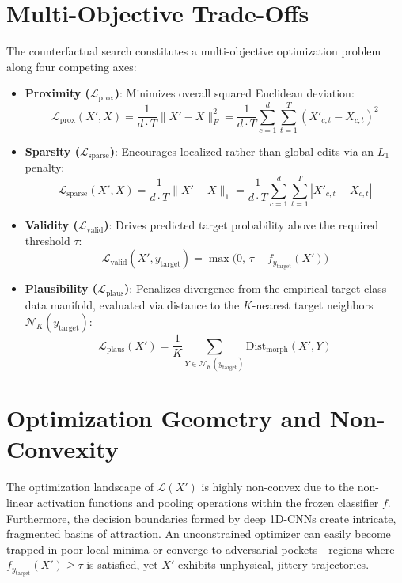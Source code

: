 \documentclass[11pt,a4paper]{report}
\begin{document}
\section{Multi-Objective Trade-Offs}
The counterfactual search constitutes a multi-objective optimization problem along four competing axes:
\begin{itemize}
    \item \textbf{Proximity ($\mathcal{L}_{\text{prox}}$)}: Minimizes overall squared Euclidean deviation:
    \begin{equation}
        \mathcal{L}_{\text{prox}}(X', X) = \frac{1}{d \cdot T} \|X' - X\|_F^2 = \frac{1}{d \cdot T} \sum_{c=1}^d \sum_{t=1}^T (X'_{c,t} - X_{c,t})^2
    \end{equation}
    \item \textbf{Sparsity ($\mathcal{L}_{\text{sparse}}$)}: Encourages localized rather than global edits via an $L_1$ penalty:
    \begin{equation}
        \mathcal{L}_{\text{sparse}}(X', X) = \frac{1}{d \cdot T} \|X' - X\|_1 = \frac{1}{d \cdot T} \sum_{c=1}^d \sum_{t=1}^T |X'_{c,t} - X_{c,t}|
    \end{equation}
    \item \textbf{Validity ($\mathcal{L}_{\text{valid}}$)}: Drives predicted target probability above the required threshold $\tau$:
    \begin{equation}
        \mathcal{L}_{\text{valid}}(X', y_{\text{target}}) = \max\Big(0, \, \tau - f_{y_{\text{target}}}(X')\Big)
    \end{equation}
    \item \textbf{Plausibility ($\mathcal{L}_{\text{plaus}}$)}: Penalizes divergence from the empirical target-class data manifold, evaluated via distance to the $K$-nearest target neighbors $\mathcal{N}_K(y_{\text{target}})$:
    \begin{equation}
        \mathcal{L}_{\text{plaus}}(X') = \frac{1}{K} \sum_{Y \in \mathcal{N}_K(y_{\text{target}})} \text{Dist}_{\text{morph}}(X', Y)
    \end{equation}
\end{itemize}

\section{Optimization Geometry and Non-Convexity}
The optimization landscape of $\mathcal{L}(X')$ is highly non-convex due to the non-linear activation functions and pooling operations within the frozen classifier $f$. Furthermore, the decision boundaries formed by deep 1D-CNNs create intricate, fragmented basins of attraction. An unconstrained optimizer can easily become trapped in poor local minima or converge to adversarial pockets—regions where $f_{y_{\text{target}}}(X') \ge \tau$ is satisfied, yet $X'$ exhibits unphysical, jittery trajectories.
\end{document}
